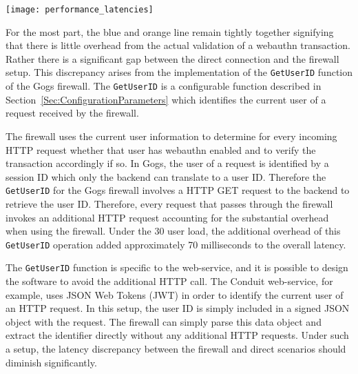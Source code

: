 \begin{center}
\texttt{[image: performance\_latencies]}
\end{center}

For the most part, the blue and orange line remain tightly together signifying that there is little overhead from the actual validation of a webauthn transaction. Rather there is a significant gap between the direct connection and the firewall setup. This discrepancy arises from the implementation of the \lstinline{GetUserID} function of the Gogs firewall. The \lstinline{GetUserID} is a configurable function described in Section~\ref{Sec:ConfigurationParameters} which identifies the current user of a request received by the firewall. 

The firewall uses the current user information to determine for every incoming HTTP request whether that user has webauthn enabled and to verify the transaction accordingly if so. In Gogs, the user of a request is identified by a session ID which only the backend can translate to a user ID. Therefore the \lstinline{GetUserID} for the Gogs firewall involves a HTTP GET request to the backend to retrieve the user ID. Therefore, every request that passes through the firewall invokes an additional HTTP request accounting for the substantial overhead when using the firewall. Under the 30 user load, the additional overhead of this \lstinline{GetUserID} operation added approximately 70 milliseconds to the overall latency.

The \lstinline{GetUserID} function is specific to the web-service, and it is possible to design the software to avoid the additional HTTP call. The Conduit web-service, for example, uses JSON Web Tokens (JWT) in order to identify the current user of an HTTP request. In this setup, the user ID is simply included in a signed JSON object with the request. The firewall can simply parse this data object and extract the identifier directly without any additional HTTP requests. Under such a setup, the latency discrepancy between the firewall and direct scenarios should diminish significantly.

\iffalse
There are three measurements

There naturally is a performance overhead suffered because of the .

  it naturally does add performance overhead.

Despite all of the advantages laid out by the webauthn firewall,
\fi
